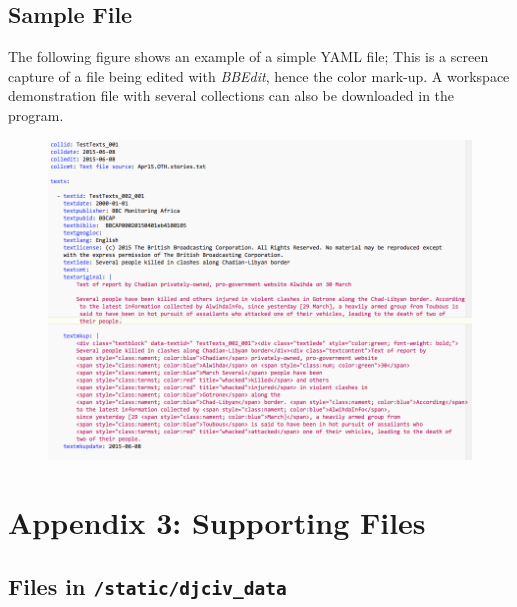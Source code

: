 \documentclass[letterpaper,10pt,english]{sphinxmanual}
\begin{document}
\section{Sample File}
\label{appendix2:sample-file}
The following figure shows an example of a simple YAML file; This is a screen capture of a file being edited with \emph{BBEdit},
hence the color mark-up. A workspace demonstration file with several collections can also be downloaded in the program.
\begin{figure}[htbp]
\centering

\includegraphics{yamlexample.png}
\end{figure}


\chapter{Appendix 3: Supporting Files}
\label{appendix3:appendix-3-supporting-files}\label{appendix3::doc}

\section{Files in \texttt{/static/djciv\_data}}
\label{appendix3:files-in-static-djciv-data}
\end{document}
